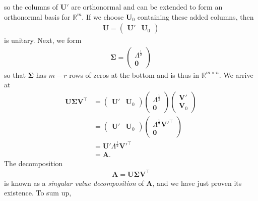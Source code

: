 \documentclass{article}
\begin{document}
so the columns of $\textbf{U}'$ are orthonormal and can be extended to form an orthonormal basis for $\mathbb{R}^m$. If we choose $\textbf{U}_0$ containing these added columns, then 
\begin{gather*}
    \textbf{U} = 
    \begin{pmatrix}
    \textbf{U}' & \textbf{U}_0
    \end{pmatrix}
\end{gather*}
is unitary. Next, we form 
\begin{gather*}
    \mathbf{\Sigma} = 
    \begin{pmatrix}
    \Lambda^{\frac{1}{2}} \\
    \textbf{0}
    \end{pmatrix}
\end{gather*}
so that $\mathbf{\Sigma}$ has $m - r$ rows of zeros at the bottom and is thus in $\mathbb{R}^{m \times n}$. 
We arrive at
\begin{align*}
    \mathbf{U\Sigma V}^\top &= 
    \begin{pmatrix}
    \textbf{U}' & \textbf{U}_0
    \end{pmatrix}
    \begin{pmatrix}
    \Lambda^{\frac{1}{2}} \\
    \textbf{0}
    \end{pmatrix}
    \begin{pmatrix}
    \textbf{V}' \\
    \textbf{V}_0
    \end{pmatrix} \\
    &= \begin{pmatrix}
    \textbf{U}' & \textbf{U}_0
    \end{pmatrix}
    \begin{pmatrix}
    \Lambda^{\frac{1}{2}}\textbf{V}'^\top \\
    \textbf{0}
    \end{pmatrix} \\
    &= \textbf{U}'\Lambda^{\frac{1}{2}}\textbf{V}'^\top \\
    &= \textbf{A}.
\end{align*}
The decomposition 
\begin{align*}
    \textbf{A} = \mathbf{U\Sigma V}^\top
\end{align*}
is known as a \textit{singular value decomposition} of $\textbf{A}$, and we have just proven its existence. To sum up,
\end{document}
